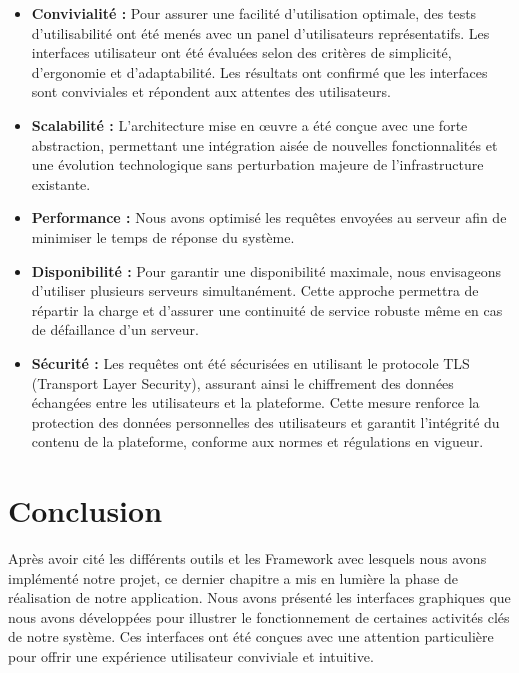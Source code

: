\begin{itemize}
    \item \textbf{Convivialité :} Pour assurer une facilité d'utilisation optimale, des tests d'utilisabilité ont été menés avec un panel d'utilisateurs représentatifs. Les interfaces utilisateur ont été évaluées selon des critères de simplicité, d'ergonomie et d'adaptabilité. Les résultats ont confirmé que les interfaces sont conviviales et répondent aux attentes des utilisateurs.
    \item \textbf{Scalabilité :} L'architecture mise en œuvre a été conçue avec une forte abstraction, permettant une intégration aisée de nouvelles fonctionnalités et une évolution technologique sans perturbation majeure de l'infrastructure existante.
    \item \textbf{Performance :} Nous avons optimisé les requêtes envoyées au serveur afin de minimiser le temps de réponse du système. 
    \item \textbf{Disponibilité :} Pour garantir une disponibilité maximale, nous envisageons d'utiliser plusieurs serveurs simultanément. Cette approche permettra de répartir la charge et d'assurer une continuité de service robuste même en cas de défaillance d'un serveur.
    \item \textbf{Sécurité :} Les requêtes ont été sécurisées en utilisant le protocole TLS (Transport Layer Security), assurant ainsi le chiffrement des données échangées entre les utilisateurs et la plateforme. Cette mesure renforce la protection des données personnelles des utilisateurs et garantit l'intégrité du contenu de la plateforme, conforme aux normes et régulations en vigueur.
\end{itemize}
    \newpage

\section*{Conclusion}
Après avoir cité les différents outils et les Framework avec lesquels nous avons implémenté notre projet, ce dernier chapitre a mis en lumière la phase de réalisation de notre application. Nous avons présenté les interfaces graphiques que nous avons développées pour illustrer le fonctionnement de certaines activités clés de notre système. Ces interfaces ont été conçues avec une attention particulière pour offrir une expérience utilisateur conviviale et intuitive.